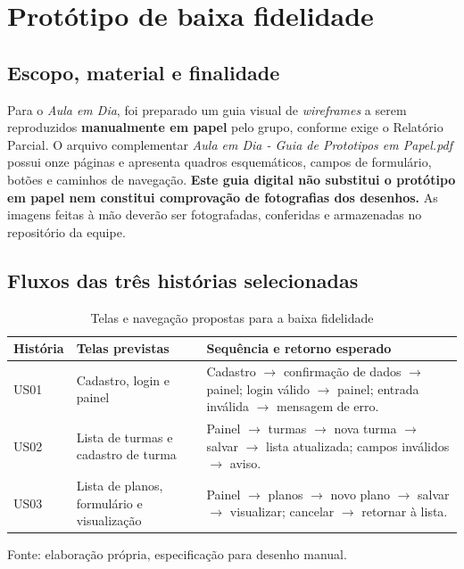 \documentclass[12pt,a4paper,oneside]{report}
\begin{document}
\section{Protótipo de baixa fidelidade}
\subsection{Escopo, material e finalidade}
Para o \textit{Aula em Dia}, foi preparado um guia visual de \textit{wireframes} a serem reproduzidos \textbf{manualmente em papel} pelo grupo, conforme exige o Relatório Parcial. O arquivo complementar \textit{Aula em Dia - Guia de Prototipos em Papel.pdf} possui onze páginas e apresenta quadros esquemáticos, campos de formulário, botões e caminhos de navegação. \textbf{Este guia digital não substitui o protótipo em papel nem constitui comprovação de fotografias dos desenhos.} As imagens feitas à mão deverão ser fotografadas, conferidas e armazenadas no repositório da equipe.

\subsection{Fluxos das três histórias selecionadas}
\begin{table}[htbp]
\centering
\caption{Telas e navegação propostas para a baixa fidelidade}
\small
\renewcommand{\arraystretch}{1.25}
\begin{tabularx}{\textwidth}{@{}>{\RaggedRight\arraybackslash}p{1.15cm}>{\RaggedRight\arraybackslash}p{3cm}>{\RaggedRight\arraybackslash}X@{}}
\toprule
\textbf{História} & \textbf{Telas previstas} & \textbf{Sequência e retorno esperado} \\
\midrule
US01 & Cadastro, login e painel & Cadastro $\rightarrow$ confirmação de dados $\rightarrow$ painel; login válido $\rightarrow$ painel; entrada inválida $\rightarrow$ mensagem de erro. \\
US02 & Lista de turmas e cadastro de turma & Painel $\rightarrow$ turmas $\rightarrow$ nova turma $\rightarrow$ salvar $\rightarrow$ lista atualizada; campos inválidos $\rightarrow$ aviso. \\
US03 & Lista de planos, formulário e visualização & Painel $\rightarrow$ planos $\rightarrow$ novo plano $\rightarrow$ salvar $\rightarrow$ visualizar; cancelar $\rightarrow$ retornar à lista. \\
\bottomrule
\end{tabularx}
\par\smallskip
\begin{minipage}{\textwidth}\footnotesize Fonte: elaboração própria, especificação para desenho manual.\end{minipage}
\end{table}
\end{document}
